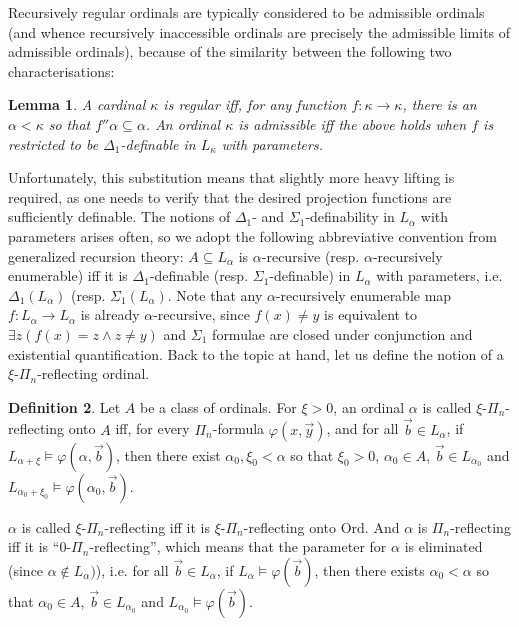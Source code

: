 \documentclass{article}
\newcommand{\Ord}{\mathrm{Ord}}
\theoremstyle{definition}
\newtheorem{definition}{Definition}[section]
\theoremstyle{plain}
\theoremstyle{plain}
\theoremstyle{plain}
\theoremstyle{plain}
\theoremstyle{remark}
\theoremstyle{remark}
\theoremstyle{remark}
\theoremstyle{plain}
\newtheorem{lemma}[definition]{Lemma}
\theoremstyle{plain}
\theoremstyle{plain}
\begin{document}
Recursively regular ordinals are typically considered to be admissible ordinals (and whence recursively inaccessible ordinals are precisely the admissible limits of admissible ordinals), because of the similarity between the following two characterisations:

\begin{lemma}
A cardinal $\kappa$ is regular iff, for any function $f: \kappa \to \kappa$, there is an $\alpha < \kappa$ so that $f''\alpha \subseteq \alpha$. An ordinal $\kappa$ is admissible iff the above holds when $f$ is restricted to be $\Delta_1$-definable in $L_\kappa$ with parameters.
\end{lemma}

Unfortunately, this substitution means that slightly more heavy lifting is required, as one needs to verify that the desired projection functions are sufficiently definable. The notions of $\Delta_1$- and $\Sigma_1$-definability in $L_\alpha$ with parameters arises often, so we adopt the following abbreviative convention from generalized recursion theory: $A \subseteq L_\alpha$ is $\alpha$-recursive (resp. $\alpha$-recursively enumerable) iff it is $\Delta_1$-definable (resp. $\Sigma_1$-definable) in $L_\alpha$ with parameters, i.e. $\Delta_1(L_\alpha)$ (resp. $\Sigma_1(L_\alpha)$. Note that any $\alpha$-recursively enumerable map $f: L_\alpha \to L_\alpha$ is already $\alpha$-recursive, since $f(x) \neq y$ is equivalent to $\exists z (f(x) = z \land z \neq y)$ and $\Sigma_1$ formulae are closed under conjunction and existential quantification. Back to the topic at hand, let us define the notion of a $\xi$-$\Pi_n$-reflecting ordinal.

\begin{definition}
\label{ReflectingOrdinal}
Let $A$ be a class of ordinals. For $\xi > 0$, an ordinal $\alpha$ is called $\xi$-$\Pi_n$-reflecting onto $A$ iff, for every $\Pi_n$-formula $\varphi(x,\vec{y})$, and for all $\vec{b} \in L_\alpha$, if $L_{\alpha+\xi} \models \varphi(\alpha, \vec{b})$, then there exist $\alpha_0, \xi_0 < \alpha$ so that $\xi_0 > 0$, $\alpha_0 \in A$, $\vec{b} \in L_{\alpha_0}$ and $L_{\alpha_0+\xi_0} \models \varphi(\alpha_0, \vec{b})$.

$\alpha$ is called $\xi$-$\Pi_n$-reflecting iff it is $\xi$-$\Pi_n$-reflecting onto $\Ord$. And $\alpha$ is $\Pi_n$-reflecting iff it is ``$0$-$\Pi_n$-reflecting'', which means that the parameter for $\alpha$ is eliminated (since $\alpha \notin L_\alpha)$), i.e. for  all $\vec{b} \in L_\alpha$, if $L_\alpha \models \varphi(\vec{b})$, then there exists $\alpha_0 < \alpha$ so that $\alpha_0 \in A$, $\vec{b} \in L_{\alpha_0}$ and $L_{\alpha_0} \models \varphi(\vec{b})$.
\end{definition}
\end{document}
